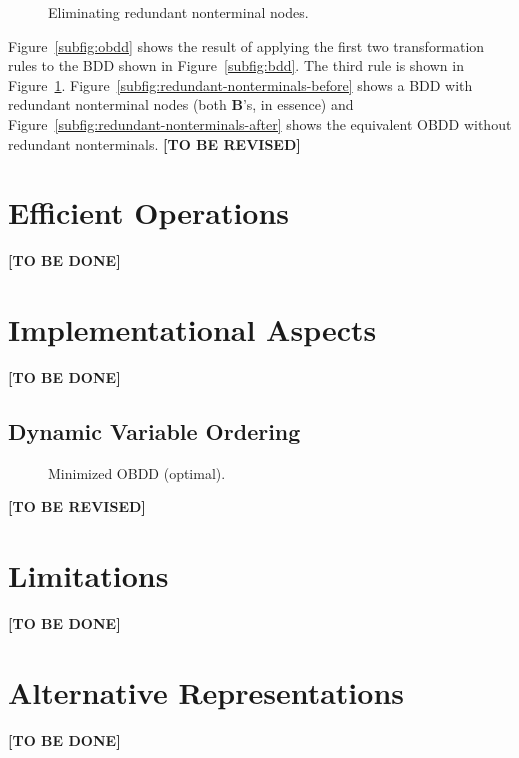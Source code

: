\documentclass{vldb}
\newcommand{\tbr}{\textbf{[TO BE REVISED]}}
\newcommand{\tbd}{\textbf{[TO BE DONE]}}
\begin{document}
\begin{figure}[ht]
    \centering
    \subfigure[]{
        
        \label{subfig:redundant-nonterminals-before}
    }
    \hskip1cm
    \subfigure[]{
        
        \label{subfig:redundant-nonterminals-after}
    }
    \caption{Eliminating redundant nonterminal nodes.}
    \label{fig:redundant-nonterminals}
\end{figure}

Figure~\ref{subfig:obdd} shows the result of applying the first two transformation
rules to the BDD shown in Figure~\ref{subfig:bdd}. The third rule is shown
in Figure~\ref{fig:redundant-nonterminals}.
Figure~\ref{subfig:redundant-nonterminals-before} shows a BDD with redundant
nonterminal nodes (both \textbf{B}'s, in essence) and
Figure~\ref{subfig:redundant-nonterminals-after} shows the equivalent OBDD without
redundant nonterminals. \tbr

\section{Efficient Operations}
\label{sec:efficient-operations}

\tbd

\section{Implementational Aspects}
\label{sec:implementation-aspects}

\tbd

\subsection{Dynamic Variable Ordering}
\label{subsec:dynamic-variable-ordering}

\begin{figure}[ht]
    \centering
    
    \label{fig:min-obdd}
    \caption{Minimized OBDD (optimal).}
\end{figure}
\tbr

\section{Limitations}
\label{sec:limitations}

\tbd

\section{Alternative Representations}
\label{sec:alternative-representations}

\tbd

\balance



\end{document}

